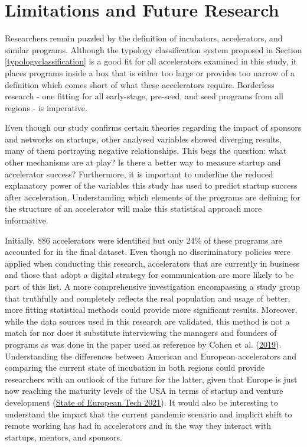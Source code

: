 \documentclass[
  12pt,
]{article}
\begin{document}
\clearpage

\hypertarget{limitations-and-future-research}{%
\section{Limitations and Future Research}\label{limitations-and-future-research}}

Researchers remain puzzled by the definition of incubators, accelerators, and similar programs. Although the typology classification system proposed in Section \ref{typologyclassification} is a good fit for all accelerators examined in this study, it places programs inside a box that is either too large or provides too narrow of a definition which comes short of what these accelerators require. Borderless research - one fitting for all early-stage, pre-seed, and seed programs from all regions - is imperative.

Even though our study confirms certain theories regarding the impact of sponsors and networks on startups, other analysed variables showed diverging results, many of them portraying negative relationships. This begs the question: what other mechanisms are at play? Is there a better way to measure startup and accelerator success? Furthermore, it is important to underline the reduced explanatory power of the variables this study has used to predict startup success after acceleration. Understanding which elements of the programs are defining for the structure of an accelerator will make this statistical approach more informative.

Initially, 886 accelerators were identified but only 24\% of these programs are accounted for in the final dataset. Even though no discriminatory policies were applied when conducting this research, accelerators that are currently in business and those that adopt a digital strategy for communication are more likely to be part of this list. A more comprehensive investigation encompassing a study group that truthfully and completely reflects the real population and usage of better, more fitting statistical methods could provide more significant results. Moreover, while the data sources used in this research are validated, this method is not a match for nor does it substitute interviewing the managers and founders of programs as was done in the paper used as reference by Cohen et al. (\protect\hyperlink{ref-cohen_design_2019}{2019}). Understanding the differences between American and European accelerators and comparing the current state of incubation in both regions could provide researchers with an outlook of the future for the latter, given that Europe is just now reaching the maturity levels of the USA in terms of startup and venture development (\protect\hyperlink{ref-european_tech_2021}{State of European Tech 2021}). It would also be interesting to understand the impact that the current pandemic scenario and implicit shift to remote working has had in accelerators and in the way they interact with startups, mentors, and sponsors.
\end{document}
